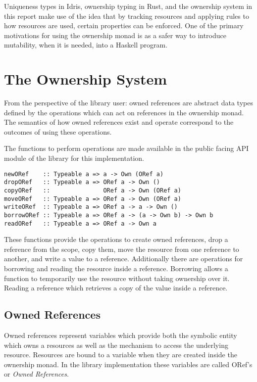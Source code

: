 \documentclass[onehalf,11pt]{beavtex}
\begin{document}
Uniqueness types in Idris, ownership typing in Rust, and the ownership system in
this report make use of the idea that by tracking resources and applying rules
to how resources are used, certain properties can be enforced.
One of the primary motivations for using the ownership monad is as a
safer way to introduce mutability, when it is needed, into a Haskell program.


\section{The Ownership System}

From the perspective of the library user: owned references are abstract
data types defined by the operations which can act on references in the
ownership monad.
The semantics of how owned references exist and operate correspond to the
outcomes of using these operations.

The functions to perform operations are made available in the public facing API
module of the library for this implementation.

\begin{verbatim}
newORef    :: Typeable a => a -> Own (ORef a)
dropORef   :: Typeable a => ORef a -> Own ()
copyORef   ::               ORef a -> Own (ORef a)
moveORef   :: Typeable a => ORef a -> Own (ORef a)
writeORef  :: Typeable a => ORef a -> a -> Own ()
borrowORef :: Typeable a => ORef a -> (a -> Own b) -> Own b
readORef   :: Typeable a => ORef a -> Own a
\end{verbatim}

These functions provide the operations to create owned references,
drop a reference from the scope, copy them, move the resource from one reference
to another,  and write a value to a reference.
Additionally there are operations for borrowing and reading the resource inside
a reference.
Borrowing allows a function to temporarily use the resource without taking
ownership over it. Reading a reference which retrieves a copy of the
value inside a reference.

\subsection{Owned References}

Owned references represent variables which provide both the symbolic entity
which owns a resources as well as the mechanism to access the underlying resource.
Resources are bound to a variable when they are created inside the ownership
monad. In the library implementation these variables are called ORef's or
\textit{Owned References}.
\end{document}
